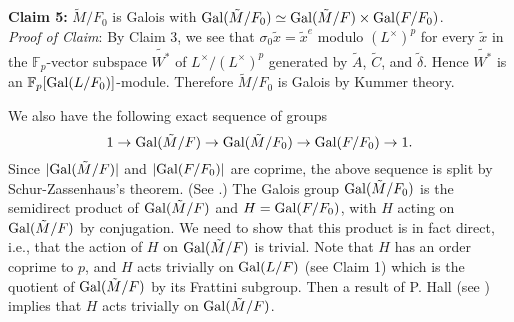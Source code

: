 \documentclass[12pt,leqno]{amsart}
\theoremstyle{plain}
\theoremstyle{definition}
\newcommand{\F}{{\mathbb F}}
\begin{document}
\\
\\
{\bf Claim 5:} $\tilde{M}/F_0$ is Galois with ${\rm Gal}(\tilde{M}/F_0)\simeq {\rm Gal}(\tilde{M}/F)\times {\rm Gal}(F/F_0)$.\\
{\it Proof of Claim}: By Claim 3, we see that $\sigma_0 \tilde{x}=\tilde{x}^e $ modulo $(L^\times)^p$ for every $\tilde{x}$ in the $\F_p$-vector subspace $\tilde{W^*}$ of $L^\times/(L^\times)^p$ generated by $\tilde{A}$, $\tilde{C}$, and $\tilde{\delta}$. Hence $\tilde{W^*}$ is an $\F_p[{\rm Gal}(L/F_0)]$-module.
Therefore $\tilde{M}/F_0$ is Galois by Kummer theory. 

We also have the following exact sequence of groups
\[
1\to {\rm Gal}(\tilde{M}/F)\to {\rm Gal}(\tilde{M}/F_0)\to {\rm Gal}(F/F_0)\to 1.
\]
Since $|{\rm Gal}(\tilde{M}/F)|$ and $|{\rm Gal}(F/F_0)|$ are coprime, the above sequence is split by Schur-Zassenhaus's theorem. (See \cite[IV.7,Theorem 25]{Za}.)
The Galois group ${\rm Gal}(\tilde{M}/F_0)$ is the semidirect product of ${\rm Gal}(\tilde{M}/F)$ and $H={\rm Gal}(F/F_0)$, with $H$ acting on ${\rm Gal}(\tilde{M}/F)$ by conjugation. We need to show that this product is in fact direct, i.e., that the action of $H$ on ${\rm Gal}(\tilde{M}/F)$ is trivial.
Note that $H$ has an order coprime to $p$, and $H$ acts trivially on ${\rm Gal}(L/F)$ (see Claim 1) which is the quotient of ${\rm Gal}(\tilde{M}/F)$ by its Frattini subgroup. 
Then a result of P. Hall (see \cite[Theorem 12.2.2]{Ha})  implies that $H$ acts trivially on ${\rm Gal}(\tilde{M}/F)$.
\end{document}
